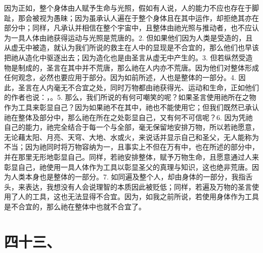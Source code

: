 因为正如，整个身体由人赋予生命与光照，假如有人说，人的能力不应也存在于脚趾，那会被视为愚昧；因为虽承认人遍在于整个身体且在其中运作，却拒绝其亦在部分中；同样，凡承认并相信在整个宇宙中，且整体由祂光照与推动者，也不应认为一具人体由祂获得运动与光照是荒唐的。2. 但如果他们因为人类是受造的，且从虚无中被造，就认为我们所说的救主在人中的显现是不合宜的，那么他们也早该把祂从造化中驱逐出去；因为造化也是由圣言从虚无中产生的。3. 但若纵然受造物是制成的，圣言在其中并不荒唐，那么祂在人内亦不荒唐。因为他们对整体形成任何观念，必然也要应用于部分。因为如前所述，人也是整体的一部分。4. 因此，圣言在人内毫无不合宜之处，同时万物都由祂获得光、运动和生命，正如他们的作者也说：，。5. 那么，我们所说的有何可嘲笑的呢？如果圣言使用祂所在之物作为工具来彰显自己？因为如果祂不在其中，祂也不能使用它；但我们既然已承认祂在整体及部分中，那么祂在所在之处彰显自己，又有何不可信呢？6. 因为凭祂自己的能力，祂完全结合于每一个与全部，毫无保留地安排万物，所以若祂愿意，无论藉太阳、月亮、天穹、大地、水或火，来说话并显示自己和圣父，无人能称为不当；因为祂同时将万物容纳为一，且事实上不但在万有中，也在所述的部分中，并在那里无形地彰显自己。同样，若祂安排整体，赋予万物生命，且愿意通过人来彰显自己，祂使用一具人体作为工具以彰显圣父的真理与知识，这也绝非荒唐。因为人类本身也是整体的一部分。7. 如同遍及整个人，却由身体的一部分，我指舌头，来表达，我想没有人会说理智的本质因此被贬低；同样，若遍及万物的圣言使用了人的工具，这也无法显得不合宜。因为，如我之前所说，若使用身体作为工具是不合宜的，那么祂在整体中也就不合宜了。\par


\section{四十三、}

